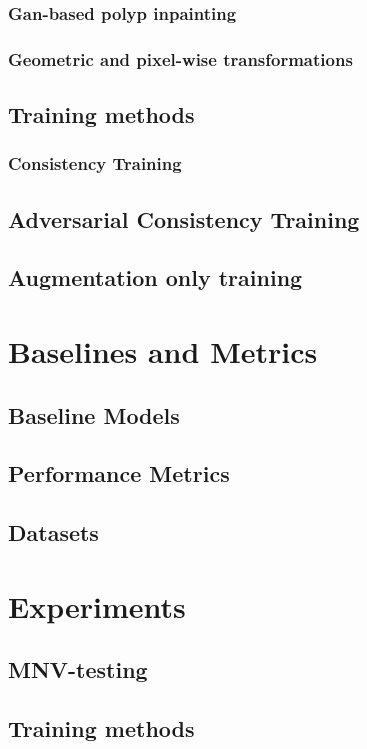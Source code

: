   		\subsubsection{Gan-based polyp inpainting}
  		\subsubsection{Geometric and pixel-wise transformations}
  	\subsection{Training methods}
		\subsubsection{Consistency Training}
		\subsection{Adversarial Consistency Training}
		\subsection{Augmentation only training}
\section{Baselines and Metrics}
    \subsection{Baseline Models}
    \subsection{Performance Metrics}
    \subsection{Datasets}
\section{Experiments}
    \subsection{MNV-testing}
	\subsection{Training methods}
